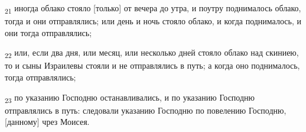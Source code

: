 \begin{tcolorbox}
\textsubscript{21} иногда облако стояло [только] от вечера до утра, и поутру поднималось облако, тогда и они отправлялись; или день и ночь стояло облако, и когда поднималось, и они тогда отправлялись;
\end{tcolorbox}
\begin{tcolorbox}
\textsubscript{22} или, если два дня, или месяц, или несколько дней стояло облако над скиниею, то и сыны Израилевы стояли и не отправлялись в путь; а когда оно поднималось, тогда отправлялись;
\end{tcolorbox}
\begin{tcolorbox}
\textsubscript{23} по указанию Господню останавливались, и по указанию Господню отправлялись в путь: следовали указанию Господню по повелению Господню, [данному] чрез Моисея.
\end{tcolorbox}
